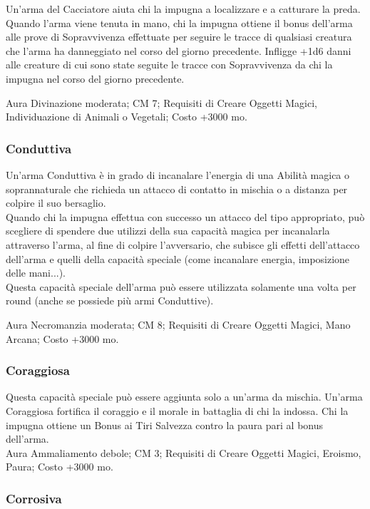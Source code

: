 \begin{multicols}{2}
Un'arma del Cacciatore aiuta chi la impugna a localizzare e a catturare la preda. Quando l'arma viene tenuta in mano, chi la impugna ottiene il bonus dell'arma alle prove di Sopravvivenza effettuate per seguire le tracce di qualsiasi creatura che l'arma ha danneggiato nel corso del giorno precedente. Infligge +1d6 danni alle creature di cui sono state seguite le tracce con Sopravvivenza da chi la impugna nel corso del giorno precedente.

Aura Divinazione moderata; CM 7; Requisiti di Creare Oggetti Magici, Individuazione di Animali o Vegetali; Costo +3000 mo.

\subsubsection{Conduttiva}

Un'arma Conduttiva è in grado di incanalare l'energia di una Abilità magica o soprannaturale che richieda un attacco di contatto in mischia o a distanza per colpire il suo bersaglio. \\
Quando chi la impugna effettua con successo un attacco del tipo appropriato, può scegliere di spendere due utilizzi della sua capacità magica per incanalarla attraverso l'arma, al fine di colpire l'avversario, che subisce gli effetti dell'attacco dell'arma e quelli della capacità speciale (come incanalare energia, imposizione delle mani...).\\
Questa capacità speciale dell'arma può essere utilizzata solamente una volta per round (anche se possiede più armi Conduttive).

Aura Necromanzia moderata; CM 8; Requisiti di Creare Oggetti Magici, Mano Arcana; Costo +3000 mo.


\subsubsection{Coraggiosa}

Questa capacità speciale può essere aggiunta solo a un'arma da mischia. Un'arma Coraggiosa fortifica il coraggio e il morale in battaglia di chi la indossa. Chi la impugna ottiene un Bonus ai Tiri Salvezza contro la paura pari al bonus dell'arma.\\ 

Aura Ammaliamento debole; CM 3; Requisiti di Creare Oggetti Magici, Eroismo, Paura; Costo +3000 mo.

\subsubsection{Corrosiva}


\end{multicols}

